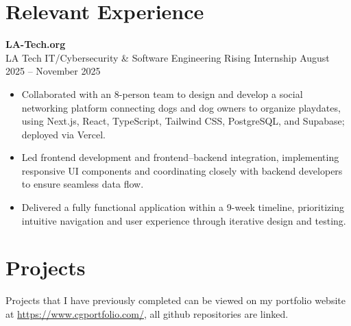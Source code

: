 \documentclass[11pt]{article}
\begin{document}
\section*{Relevant Experience}
\textbf{LA-Tech.org} \\
LA Tech IT/Cybersecurity \& Software Engineering 
Rising Internship
\hfill August 2025 -- November 2025
\begin{itemize}[leftmargin=*, itemsep=2pt]
    \item Collaborated with an 8-person team to design and develop a social networking platform connecting dogs and dog owners to organize playdates, using Next.js, React, TypeScript, Tailwind CSS, PostgreSQL, and Supabase; deployed via Vercel.
    \item Led frontend development and frontend–backend integration, implementing responsive UI components and coordinating closely with backend developers to ensure seamless data flow.
    \item Delivered a fully functional application within a 9-week timeline, prioritizing intuitive navigation and user experience through iterative design and testing.
\end{itemize}

\section*{Projects}
Projects that I have previously completed can be viewed on my portfolio website at \href{https://www.cgportfolio.com/}{https://www.cgportfolio.com/}, all github repositories are linked.
\end{document}
